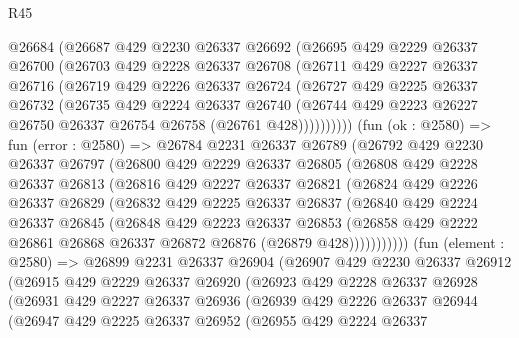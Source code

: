 \begin{lexlean}{R45}
\begin{coremodule}
      @26684
      (@26687
        @429
        @2230
        @26337
        @26692
        (@26695
          @429
          @2229
          @26337
          @26700
          (@26703
            @429
            @2228
            @26337
            @26708
            (@26711
              @429
              @2227
              @26337
              @26716
              (@26719
                @429
                @2226
                @26337
                @26724
                (@26727
                  @429
                  @2225
                  @26337
                  @26732
                  (@26735
                    @429
                    @2224
                    @26337
                    @26740
                    (@26744 @429 @2223 @26227 @26750 @26337 @26754 @26758 (@26761 @428))))))))))
    (fun (ok : @2580) =>
    fun (error : @2580) =>
    @26784
      @2231
      @26337
      @26789
      (@26792
        @429
        @2230
        @26337
        @26797
        (@26800
          @429
          @2229
          @26337
          @26805
          (@26808
            @429
            @2228
            @26337
            @26813
            (@26816
              @429
              @2227
              @26337
              @26821
              (@26824
                @429
                @2226
                @26337
                @26829
                (@26832
                  @429
                  @2225
                  @26337
                  @26837
                  (@26840
                    @429
                    @2224
                    @26337
                    @26845
                    (@26848
                      @429
                      @2223
                      @26337
                      @26853
                      (@26858 @429 @2222 @26861 @26868 @26337 @26872 @26876 (@26879 @428)))))))))))
    (fun (element : @2580) =>
    @26899
      @2231
      @26337
      @26904
      (@26907
        @429
        @2230
        @26337
        @26912
        (@26915
          @429
          @2229
          @26337
          @26920
          (@26923
            @429
            @2228
            @26337
            @26928
            (@26931
              @429
              @2227
              @26337
              @26936
              (@26939
                @429
                @2226
                @26337
                @26944
                (@26947
                  @429
                  @2225
                  @26337
                  @26952
                  (@26955
                    @429
                    @2224
                    @26337

\end{coremodule}
\end{lexlean}
